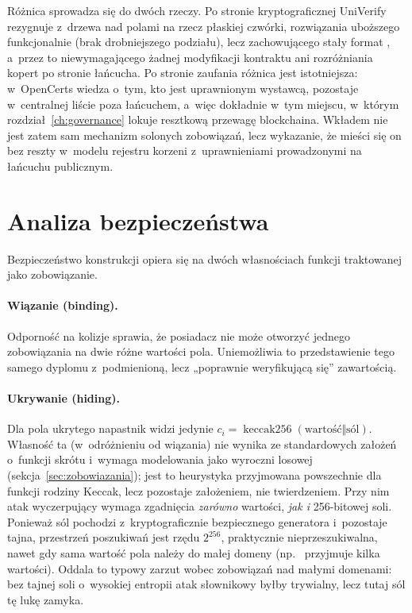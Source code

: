 Różnica sprowadza się do dwóch rzeczy. Po stronie kryptograficznej UniVerify
rezygnuje z~drzewa nad polami na rzecz płaskiej czwórki, rozwiązania uboższego
funkcjonalnie (brak drobniejszego podziału), lecz zachowującego stały format
, a~przez to niewymagającego żadnej modyfikacji kontraktu ani
rozróżniania kopert po stronie łańcucha. Po stronie zaufania różnica jest
istotniejsza: w~OpenCerts wiedza o~tym, kto jest uprawnionym wystawcą, pozostaje
w~centralnej liście poza łańcuchem, a~więc dokładnie w~tym miejscu, w~którym
rozdział~\ref{ch:governance} lokuje resztkową przewagę blockchaina. Wkładem
nie jest zatem sam mechanizm solonych zobowiązań, lecz wykazanie, że mieści się on
bez reszty w~modelu rejestru korzeni z~uprawnieniami prowadzonymi na łańcuchu
publicznym.

\section{Analiza bezpieczeństwa}
\label{sec:priv-bezpieczenstwo}

Bezpieczeństwo konstrukcji opiera się na dwóch własnościach funkcji
 traktowanej jako zobowiązanie.

\paragraph{Wiązanie (binding).} Odporność  na kolizje sprawia, że
posiadacz nie może otworzyć jednego zobowiązania na dwie różne wartości pola.
Uniemożliwia to przedstawienie tego samego dyplomu z~podmienioną, lecz „poprawnie
weryfikującą się'' zawartością.

\paragraph{Ukrywanie (hiding).} Dla pola ukrytego napastnik widzi jedynie
$c_i = \operatorname{keccak256}(\text{wartość} \Vert \text{sól})$. Własność ta
(w~odróżnieniu od wiązania) nie wynika ze standardowych założeń o~funkcji skrótu
i~wymaga modelowania  jako wyroczni losowej
(sekcja~\ref{sec:zobowiazania}); jest to heurystyka przyjmowana powszechnie dla
funkcji rodziny Keccak, lecz pozostaje założeniem, nie twierdzeniem. Przy nim atak
wyczerpujący wymaga zgadnięcia \emph{zarówno} wartości, \emph{jak i} 256-bitowej
soli. Ponieważ sól pochodzi z~kryptograficznie bezpiecznego generatora i~pozostaje
tajna, przestrzeń poszukiwań jest rzędu $2^{256}$, praktycznie
nieprzeszukiwalna, nawet gdy sama wartość pola należy do małej domeny (np.\
 przyjmuje kilka wartości). Oddala to typowy zarzut wobec
zobowiązań nad małymi domenami: bez tajnej soli o~wysokiej entropii atak słownikowy
byłby trywialny, lecz tutaj sól tę lukę zamyka.

